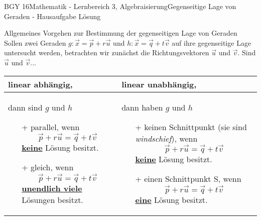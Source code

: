 \documentclass[oneside,openany,headings=optiontotoc,11pt,numbers=noenddot]{scrreprt}
\begin{document}
	\begin{worksheet}{BGY 16}{Mathematik - Lernbereich 3, Algebraisierung}{Gegenseitige Lage von Geraden - Hausaufgabe Lösung}
		
		\begin{framed}
			\noindent
			\tiny{\color{codegray}Allgemeines Vorgehen zur Bestimmung der gegenseitigen Lage von Geraden}\\
			\normalsize
			Sollen zwei Geraden \(g: \vec{x} = \vec{p} + r\vec{u}\) und \(h: \vec{x} = \vec{q}+ t\vec{v}\) auf ihre gegenseitige Lage untersucht werden, betrachten wir zunächst die Richtungsvektoren \(\vec{u}\) und \(\vec{v}\). Sind \(\vec{u}\) und \(\vec{v}\)...\\
			\par\noindent
			\begin{tabularx}{\textwidth}{X|X}
				\color{blue}linear abhängig\normalcolor, & \color{blue}linear unabhängig\normalcolor,\\
				\hline
				dann sind \(g\) und \(h\)
				\begin{itemize}
					\item[+] \color{codegreen}parallel\normalcolor{}, wenn \[\vec{p} + r\vec{u} = \vec{q} + t\vec{v}\] \underline{\textbf{keine}} Lösung besitzt.
					\item[+] \color{red}gleich\normalcolor{}, wenn \[\vec{p} + r\vec{u} = \vec{q} + t\vec{v}\] \underline{\textbf{unendlich viele}} Lösungen besitzt.
				\end{itemize} & dann haben \(g\) und \(h\)
			\begin{itemize}
				\item[+] \color{codegreen}keinen\normalcolor{} Schnittpunkt (sie sind \textit{windschief}), wenn \[\vec{p} + r\vec{u} = \vec{q} + t\vec{v}\] \underline{\textbf{keine}} Lösung besitzt.
				\item[+] \color{red}einen\normalcolor{} Schnittpunkt S, wenn \[\vec{p} + r\vec{u} = \vec{q} + t\vec{v}\] \underline{\textbf{eine}} Lösung besitzt.
				
		\end{itemize}\\
			\end{tabularx}
		\end{framed}
		

\end{worksheet}
\end{document}
